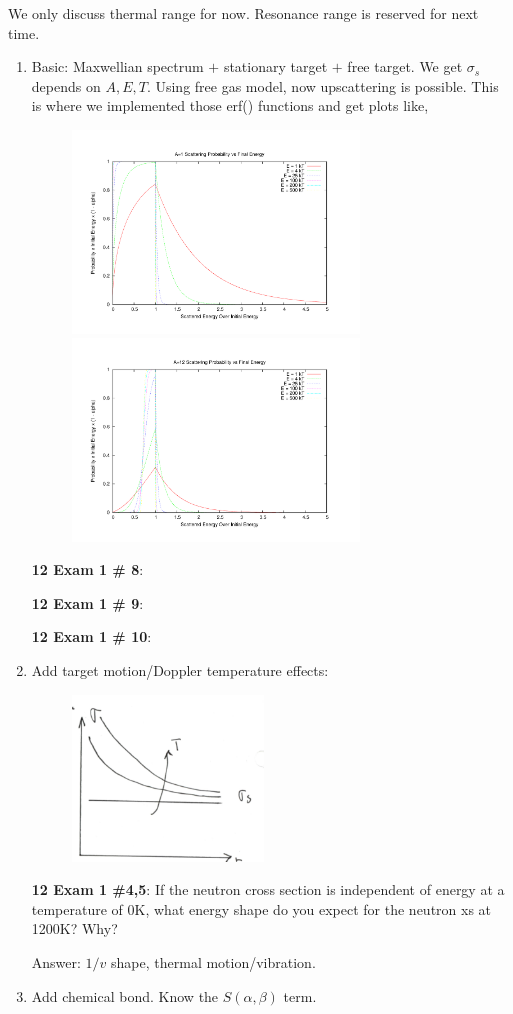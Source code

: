 \documentclass{school-22.211-notes}
\begin{document}
\clearpage
{}
We only discuss thermal range for now. Resonance range is reserved for next time. 
\begin{enumerate}
\item Basic: Maxwellian spectrum $+$ stationary target $+$ free target. We get $\sigma_s$ depends on $A, E, T$. Using free gas model, now upscattering is possible. This is where we implemented those erf() functions and get plots like, 
  \begin{figure}[ht]
  \centering
  \includegraphics[width=3in]{images/sl-d/ts_H.uncrop.pdf}
  \includegraphics[width=3in]{images/sl-d/ts_C.uncrop.pdf}
\end{figure}
 
\textbf{12 Exam 1 \# 8}: 

\textbf{12 Exam 1 \# 9}: 

\textbf{12 Exam 1 \# 10}: 

\item Add target motion/Doppler temperature effects: 
\begin{figure}[ht]
  \centering
  \includegraphics[width=2in]{images/sl-d/Doppler.png}
\end{figure}


\textbf{12 Exam 1 \#4,5}: If the neutron cross section is independent of energy at a temperature of 0K, what energy shape do you expect for the neutron xs at 1200K? Why? 

Answer: $1/v$ shape, thermal motion/vibration.

\item Add chemical bond. 
  Know the $S(\alpha, \beta)$ term. 
\end{enumerate}
\end{document}
